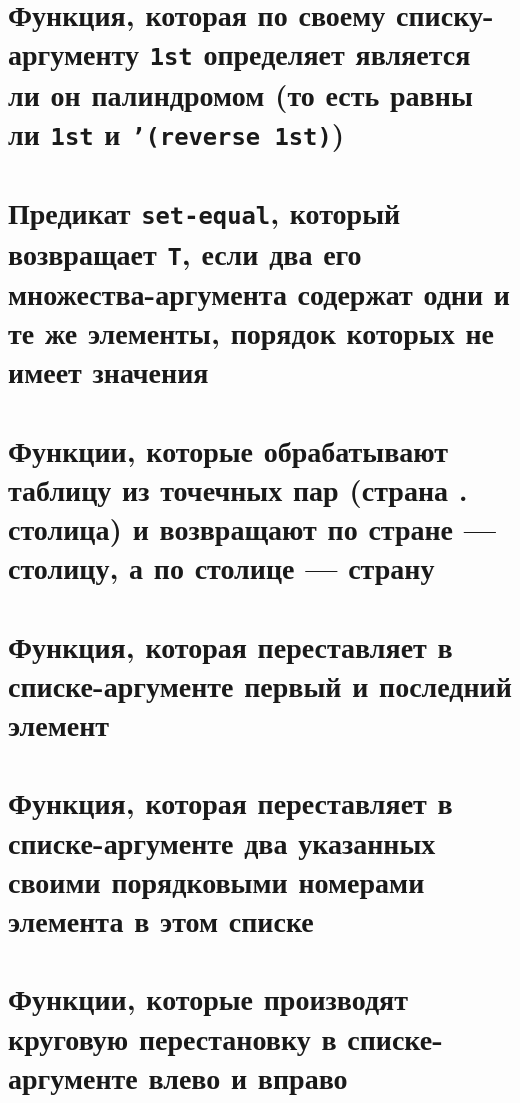 
\section{Функция, которая по своему списку-аргументу \texttt{1st} определяет является ли он палиндромом (то есть равны ли \texttt{1st} и \texttt{'(reverse 1st)})}



\section{Предикат \texttt{set-equal}, который возвращает \texttt{T}, если два его множества-аргу\-мента содержат одни и те же элементы, порядок которых не имеет значения}




\section{Функции, которые обрабатывают таблицу из точечных пар (страна . столица) и возвращают по стране --- столицу, а по столице --- страну}




\section{Функция, которая переставляет в списке-аргументе первый и последний элемент}






\section{Функция, которая переставляет в списке-аргументе два указанных своими порядковыми номерами элемента в этом списке}



\section{Функции, которые производят круговую перестановку в списке-аргументе влево и вправо}



